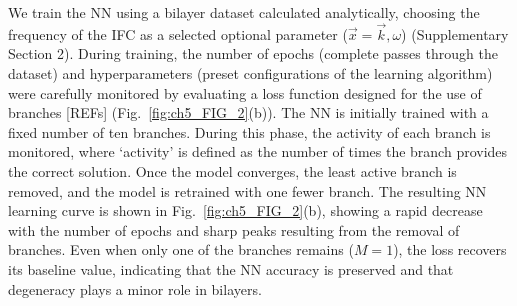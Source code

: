 We train the NN using a bilayer dataset calculated analytically, choosing the frequency of the IFC as a selected optional parameter ($\vec{x}=\vec{k},\omega$) (Supplementary Section 2). During training, the number of epochs (complete passes through the dataset) and hyperparameters (preset configurations of the learning algorithm) were carefully monitored by evaluating a loss function designed for the use of branches [REFs] (Fig.~\ref{fig:ch5_FIG_2}(b)). The NN is initially trained with a fixed number of ten branches. During this phase, the activity of each branch is monitored, where `activity' is defined as the number of times the branch provides the correct solution. Once the model converges, the least active branch is removed, and the model is retrained with one fewer branch. The resulting NN learning curve is shown in Fig.~\ref{fig:ch5_FIG_2}(b), showing a rapid decrease with the number of epochs and sharp peaks resulting from the removal of branches. Even when only one of the branches remains ($M=1$), the loss recovers its baseline value, indicating that the NN accuracy is preserved and that degeneracy plays a minor role in bilayers.

